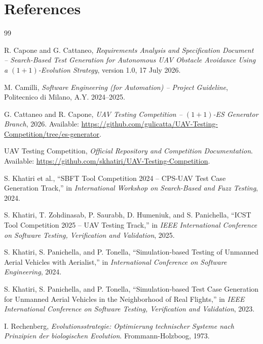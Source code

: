\documentclass[11pt,a4paper]{report}
\begin{document}
\chapter{References}

\begin{thebibliography}{99}

R. Capone and G. Cattaneo, \emph{Requirements Analysis and Specification Document -- Search-Based Test Generation for Autonomous UAV Obstacle Avoidance Using a $(1+1)$-Evolution Strategy}, version 1.0, 17 July 2026.

M. Camilli, \emph{Software Engineering (for Automation) -- Project Guideline}, Politecnico di Milano, A.Y. 2024--2025.

G. Cattaneo and R. Capone, \emph{UAV Testing Competition -- $(1+1)$-ES Generator Branch}, 2026. Available: \url{https://github.com/gulicatta/UAV-Testing-Competition/tree/es-generator}.

UAV Testing Competition, \emph{Official Repository and Competition Documentation}. Available: \url{https://github.com/skhatiri/UAV-Testing-Competition}.

S. Khatiri et al., ``SBFT Tool Competition 2024 -- CPS-UAV Test Case Generation Track,'' in \emph{International Workshop on Search-Based and Fuzz Testing}, 2024.

S. Khatiri, T. Zohdinasab, P. Saurabh, D. Humeniuk, and S. Panichella, ``ICST Tool Competition 2025 -- UAV Testing Track,'' in \emph{IEEE International Conference on Software Testing, Verification and Validation}, 2025.

S. Khatiri, S. Panichella, and P. Tonella, ``Simulation-based Testing of Unmanned Aerial Vehicles with Aerialist,'' in \emph{International Conference on Software Engineering}, 2024.

S. Khatiri, S. Panichella, and P. Tonella, ``Simulation-based Test Case Generation for Unmanned Aerial Vehicles in the Neighborhood of Real Flights,'' in \emph{IEEE International Conference on Software Testing, Verification and Validation}, 2023.

I. Rechenberg, \emph{Evolutionsstrategie: Optimierung technischer Systeme nach Prinzipien der biologischen Evolution}. Frommann-Holzboog, 1973.

\end{thebibliography}
\end{document}
